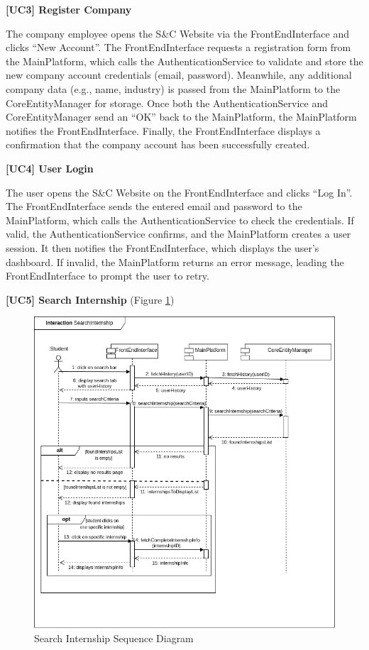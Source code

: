 \textbf{[UC3] Register Company}

The company employee opens the S\&C Website via the FrontEndInterface and clicks ``New Account''. The FrontEndInterface requests a registration form from the MainPlatform, which calls the AuthenticationService to validate and store the new company account credentials (email, password). Meanwhile, any additional company data (e.g., name, industry) is passed from the MainPlatform to the CoreEntityManager for storage. Once both the AuthenticationService and CoreEntityManager send an ``OK'' back to the MainPlatform, the MainPlatform notifies the FrontEndInterface. Finally, the FrontEndInterface displays a confirmation that the company account has been successfully created.

\textbf{[UC4] User Login}

The user opens the S\&C Website on the FrontEndInterface and clicks ``Log In''. The FrontEndInterface sends the entered email and password to the MainPlatform, which calls the AuthenticationService to check the credentials. If valid, the AuthenticationService confirms, and the MainPlatform creates a user session. It then notifies the FrontEndInterface, which displays the user’s dashboard. If invalid, the MainPlatform returns an error message, leading the FrontEndInterface to prompt the user to retry.


\textbf{[UC5] Search Internship} (Figure \ref{fig:searchsequence})
\begin{figure}[H]
\centering
\includegraphics[width=\textwidth]{Images/search-internship-sequence.png}
\caption{\label{fig:searchsequence} Search Internship Sequence Diagram}
\end{figure}


